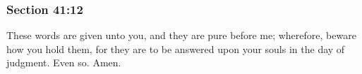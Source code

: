 
	\subsubsection{Section 41:12} %
		\label{DC41-12}

		These words are given unto you, and they are pure before me; wherefore, beware how you hold them, for they are to be answered upon your souls in the day of judgment.  Even so.  Amen.

